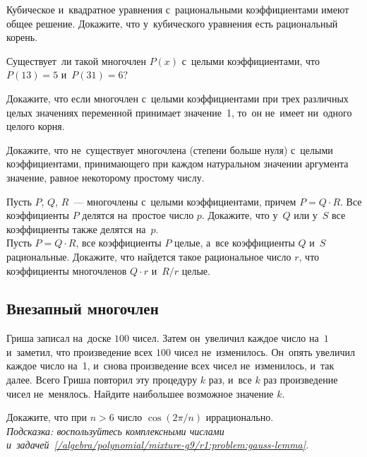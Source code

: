 \begin{problems}

\item
Кубическое и~квадратное уравнения с~рациональными коэффициентами имеют общее
решение.
Докажите, что у~кубического уравнения есть рациональный корень.

\item
Существует~ли такой многочлен $P(x)$ с~целыми коэффициентами, что
$P(13) = 5$ и~$P(31) = 6$?

\item
Докажите, что если многочлен с~целыми коэффициентами при трех различных целых
значениях переменной принимает значение~1, то~он не~имеет ни~одного целого
корня.

\item
Докажите, что не~существует многочлена (степени больше нуля) с~целыми
коэффициентами, принимающего при каждом натуральном значении аргумента
значение, равное некоторому простому числу.

\item
\label{/algebra/polynomial/mixture-g9/r1:problem:gauss-lemma}%
\subproblem
Пусть $P$, $Q$, $R$~--- многочлены с~целыми коэффициентами, причем
$P = Q \cdot R$.
Все коэффициенты $P$ делятся на~простое число $p$.
Докажите, что у~$Q$ или у~$S$ все коэффициенты также делятся на~$p$.
\\
\subproblem
Пусть $P = Q \cdot R$, все коэффициенты $P$ целые, а~все коэффициенты $Q$ и~$S$
рациональные.
Докажите, что найдется такое рациональное число $r$, что коэффициенты
многочленов $Q \cdot r$ и~$R / r$ целые.

\end{problems}

\subsection*{Внезапный многочлен}

\begin{problems}

\item
Гриша записал на~доске $100$ чисел.
Затем он~увеличил каждое число на~$1$ и~заметил, что произведение всех
$100$ чисел не~изменилось.
Он~опять увеличил каждое число на~1, и~снова произведение всех чисел
не~изменилось, и~так далее.
Всего Гриша повторил эту процедуру $k$ раз, и~все $k$ раз произведение чисел
не~менялось.
Найдите наибольшее возможное значение $k$.

\item
Докажите, что при $n > 6$ число $\cos(2 \pi / n)$ иррационально.
\\\emph{Подсказка: воспользуйтесь комплексными числами
и~задачей~\ref{/algebra/polynomial/mixture-g9/r1:problem:gauss-lemma}.}

\end{problems}


